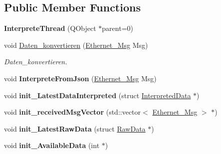 \subsection*{Public Member Functions}
\begin{DoxyCompactItemize}
\item 
\hypertarget{class_interprete_thread_ab0a4b3eed2973554a85ae62069da0830}{}{\bfseries Interprete\+Thread} (Q\+Object $\ast$parent=0)\label{class_interprete_thread_ab0a4b3eed2973554a85ae62069da0830}

\item 
void \hyperlink{class_interprete_thread_a9e2e7ed3a9608daa29393850ce380ffc}{Daten\+\_\+konvertieren} (\hyperlink{struct_ethernet___msg}{Ethernet\+\_\+\+Msg} Msg)
\begin{DoxyCompactList}\small\item\em Daten\+\_\+konvertieren. \end{DoxyCompactList}\item 
\hypertarget{class_interprete_thread_ad5a48ad3b85aefb7bff76414589fa5a5}{}void {\bfseries Interprete\+From\+Json} (\hyperlink{struct_ethernet___msg}{Ethernet\+\_\+\+Msg} Msg)\label{class_interprete_thread_ad5a48ad3b85aefb7bff76414589fa5a5}

\item 
\hypertarget{class_interprete_thread_aeaac0ccd7cc19a774c328ecef95c7e76}{}void {\bfseries init\+\_\+\+Latest\+Data\+Interpreted} (struct \hyperlink{struct_interpreted_data}{Interpreted\+Data} $\ast$)\label{class_interprete_thread_aeaac0ccd7cc19a774c328ecef95c7e76}

\item 
\hypertarget{class_interprete_thread_a9106a12f445bf84eccf5c5dd3aabacb0}{}void {\bfseries init\+\_\+received\+Msg\+Vector} (std\+::vector$<$ \hyperlink{struct_ethernet___msg}{Ethernet\+\_\+\+Msg} $>$ $\ast$)\label{class_interprete_thread_a9106a12f445bf84eccf5c5dd3aabacb0}

\item 
\hypertarget{class_interprete_thread_a0b7d95389d386788d95764e244c87deb}{}void {\bfseries init\+\_\+\+Latest\+Raw\+Data} (struct \hyperlink{struct_raw_data}{Raw\+Data} $\ast$)\label{class_interprete_thread_a0b7d95389d386788d95764e244c87deb}

\item 
\hypertarget{class_interprete_thread_ada92262f4fe1ec478be5b023693e4e65}{}void {\bfseries init\+\_\+\+Available\+Data} (int $\ast$)\label{class_interprete_thread_ada92262f4fe1ec478be5b023693e4e65}

\end{DoxyCompactItemize}

